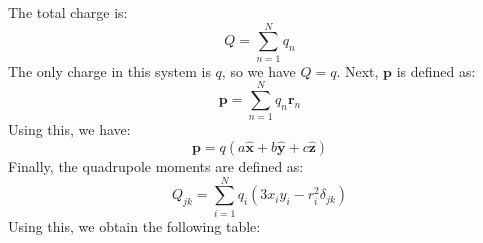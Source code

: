                 \begin{solution}
                    The total charge is:
                    \begin{equation}
                        Q=\sum_{n=1}^{N}q_{n}
                    \end{equation}
                    The only charge in this system is $q$, so we have
                    $Q=q$. Next, $\mathbf{p}$ is defined as:
                    \begin{equation}
                        \mathbf{p}=
                        \sum_{n=1}^{N}q_{n}\mathbf{r}_{n}
                    \end{equation}
                    Using this, we have:
                    \begin{equation}
                        \mathbf{p}=q(a\hat{\mathbf{x}}+
                                     b\hat{\mathbf{y}}+
                                     c\hat{\mathbf{z}})
                    \end{equation}
                    Finally, the quadrupole moments are defined as:
                    \begin{equation}
                        Q_{jk}=\sum_{i=1}^{N}
                            q_{i}(3x_{i}y_{i}-r^{2}_{i}\delta_{jk})
                    \end{equation}
                    Using this, we obtain the following table:
                    \begin{table}[H]
                        \centering
                        \captionsetup{type=table}
\end{table}
\end{solution}
